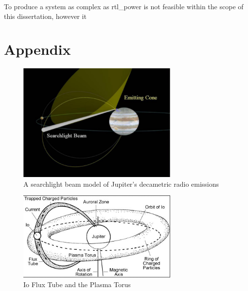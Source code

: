 \documentclass[runningheads,a4paper]{llncs}
\begin{document}
To produce a system as complex as rtl\_power is not feasible within the scope of this dissertation, however it

%
\appendix
\chapter*{Appendix}

%
\begin{figure}[here]
\centering
\includegraphics[width=8cm]{images/12}
\caption{A searchlight beam model of Jupiter's decametric radio emissions \citep{imai-08}}
\label{fig:decametric_emissions_searchlight}
\end{figure}
%

%
\begin{figure}[here]
\centering
\includegraphics[width=8cm]{images/13}
\caption{Io Flux Tube and the Plasma Torus \citep{lang-10}}
\label{fig:io_flux_tube_plasma_torus}
\end{figure}
%
\end{document}
